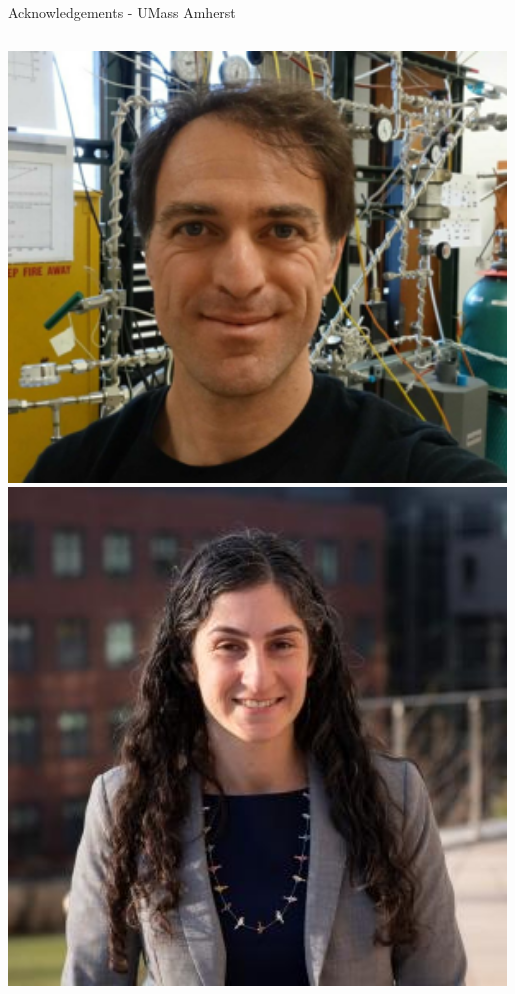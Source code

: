 \documentclass[aspectratio=169]{beamer}
\begin{document}
\begin{frame}{Acknowledgements - UMass Amherst}
\begin{columns}
            \centering
            \includegraphics[width=0.99\textwidth]{people/umassprofs/pocar.png}
            \includegraphics[width=0.99\textwidth]{people/umassprofs/schiffman.png}
            \centering

\end{columns}
\end{frame}
\end{document}
